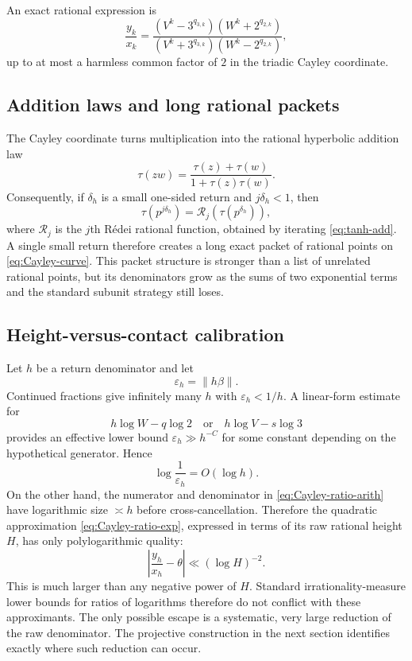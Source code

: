 \documentclass[11pt]{article}
\theoremstyle{definition}
\theoremstyle{remark}
\newcommand{\eps}{\varepsilon}
\begin{document}
An exact rational expression is
\begin{equation}\label{eq:Cayley-ratio-arith}
 \frac{y_k}{x_k}
 =
 \frac{(V^k-3^{q_{3,k}})(W^k+2^{q_{2,k}})}
 {(V^k+3^{q_{3,k}})(W^k-2^{q_{2,k}})},
\end{equation}
up to at most a harmless common factor of $2$ in the triadic Cayley coordinate.

\subsection{Addition laws and long rational packets}

The Cayley coordinate turns multiplication into the rational hyperbolic addition law
\begin{equation}\label{eq:tanh-add}
 \tau(zw)=\frac{\tau(z)+\tau(w)}{1+\tau(z)\tau(w)}.
\end{equation}
Consequently, if $\delta_h$ is a small one-sided return and $j\delta_h<1$, then
\begin{equation}\label{eq:redei}
 \tau(p^{j\delta_h})=\mathcal R_j(\tau(p^{\delta_h})),
\end{equation}
where $\mathcal R_j$ is the $j$th R\'edei rational function, obtained by iterating \eqref{eq:tanh-add}.  A single small return therefore creates a long exact packet of rational points on \eqref{eq:Cayley-curve}.  This packet structure is stronger than a list of unrelated rational points, but its denominators grow as the sums of two exponential terms and the standard subunit strategy still loses.

\subsection{Height-versus-contact calibration}

Let $h$ be a return denominator and let
\[
 \eps_h=\|h\beta\|.
\]
Continued fractions give infinitely many $h$ with $\eps_h<1/h$.  A linear-form estimate for
\[
 h\log W-q\log2
 \quad\text{or}\quad
 h\log V-s\log3
\]
provides an effective lower bound $\eps_h\gg h^{-C}$ for some constant depending on the hypothetical generator.  Hence
\begin{equation}\label{eq:poly-return}
 \log\frac1{\eps_h}=O(\log h).
\end{equation}
On the other hand, the numerator and denominator in \eqref{eq:Cayley-ratio-arith} have logarithmic size $\asymp h$ before cross-cancellation.  Therefore the quadratic approximation \eqref{eq:Cayley-ratio-exp}, expressed in terms of its raw rational height $H$, has only polylogarithmic quality:
\begin{equation}\label{eq:polylog-approx}
 \left|\frac{y_h}{x_h}-\theta\right|
 \ll (\log H)^{-2}.
\end{equation}
This is much larger than any negative power of $H$.  Standard irrationality-measure lower bounds for ratios of logarithms therefore do not conflict with these approximants.  The only possible escape is a systematic, very large reduction of the raw denominator.  The projective construction in the next section identifies exactly where such reduction can occur.
\end{document}
